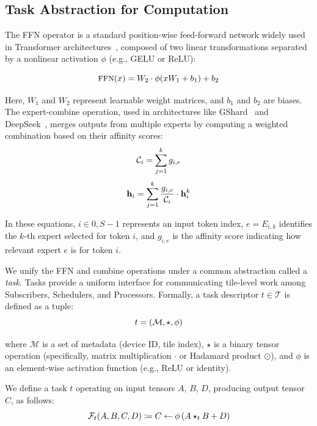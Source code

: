 \subsection{Task Abstraction for Computation}\label{subsec:task-abstraction-for-computation}

The FFN operator is a standard position-wise feed-forward network widely used in Transformer architectures~\cite{NIPS2017_3f5ee243}, composed of two linear transformations separated by a nonlinear activation $\phi$ (e.g., GELU or ReLU):

\begin{equation}\label{eq:ffn}
    \small
\textrm{FFN}(x) = W_2 \cdot \phi(x W_1 + b_1) + b_2
\end{equation}

Here, $W_1$ and $W_2$ represent learnable weight matrices, and $b_1$ and $b_2$ are biases.
The expert-combine operation, used in architectures like GShard~\cite{DBLP:conf/iclr/LepikhinLXCFHKS21} and DeepSeek~\cite{deepep}, merges outputs from multiple experts by computing a weighted combination based on their affinity scores:
\begin{equation}\label{eq:combine1}\small
\mathcal{C}_i = \sum\limits_{j = 1}^k g_{i, e}
\end{equation}
\begin{equation}\label{eq:combine2}\small
\mathbf{h}_i = \sum\limits_{j = 1}^k \frac{g_{i, e}}{\mathcal{C}_i}\cdot \mathbf{h}_i^k
\end{equation}

In these equations, $i \in {0, S - 1}$ represents an input token index, $e = E_{i,k}$ identifies the $k$-th expert selected for token $i$, and $g_{i,e}$ is the affinity score indicating how relevant expert $e$ is for token $i$.

We unify the FFN and combine operations under a common abstraction called a \emph{task}. Tasks provide a uniform interface for communicating tile-level work among Subscribers, Schedulers, and Processors. Formally, a task descriptor $t \in \mathcal{T}$ is defined as a tuple:
\[\small
    t = (\mathcal{M}, \star, \phi)
\]

where $\mathcal{M}$ is a set of metadata (\eg  device ID, tile index), $\star$ is a binary tensor operation (specifically, matrix multiplication $\cdot$ or Hadamard product $\odot$), and $\phi$ is an element-wise activation function (e.g., ReLU or identity). 

We define a task $t$ operating on input tensors $A$, $B$, $D$, producing output tensor $C$, as follows:
\begin{equation}\label{eq:task_def}\small
    \mathcal{F}_t(A, B, C, D) \coloneqq C \gets \phi\left(A \star_t B + D\right)
\end{equation}

